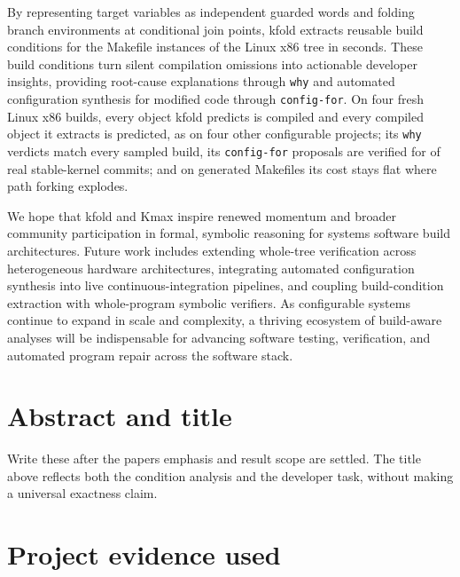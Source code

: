 \documentclass[acmsmall]{acmart}
\newcommand{\tool}{\textsf{kfold}\xspace}
\newcommand{\kmax}{\textsf{Kmax}\xspace}
\begin{document}
By representing target variables as independent guarded words and folding branch environments at conditional join points, \tool extracts reusable build conditions for the \NLinuxInstances Makefile instances of the Linux \NLinuxVersion x86 tree in \NLinuxSeconds seconds.
These build conditions turn silent compilation omissions into actionable developer insights, providing root-cause explanations through \texttt{why} and automated configuration synthesis for modified code through \texttt{config-for}.
On four fresh Linux x86 builds, every object \tool predicts is compiled and every compiled object it extracts is predicted, as on four other configurable projects; its \texttt{why} verdicts match every sampled build, its \texttt{config-for} proposals are verified for \NConfigforSelectable of \NConfigforCommits real stable-kernel commits; and on generated Makefiles its cost stays flat where path forking explodes.

We hope that \tool and \kmax inspire renewed momentum and broader community participation in formal, symbolic reasoning for systems software build architectures.
Future work includes extending whole-tree verification across heterogeneous hardware architectures, integrating automated configuration synthesis into live continuous-integration pipelines, and coupling build-condition extraction with whole-program symbolic verifiers.
As configurable systems continue to expand in scale and complexity, a thriving ecosystem of build-aware analyses will be indispensable for advancing software testing, verification, and automated program repair across the software stack.

\section*{Abstract and title}\label{abstract-and-title}

Write these after the paper\textquotesingle s emphasis and result scope are settled. The title above reflects both the condition analysis and the developer task, without making a universal exactness claim.

\section*{Project evidence used}\label{project-evidence-used}
\end{document}

